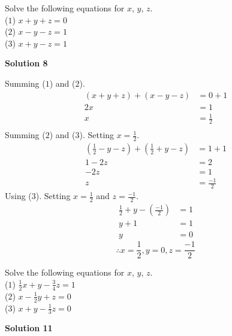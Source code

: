 \begin{tcolorbox}[title=Problem 8, breakable]
    Solve the following equations for $x$, $y$, $z$. \\
    ($1$) $x + y + z = 0$ \\
    ($2$) $x - y - z = 1$ \\
    ($3$) $x + y - z = 1$
\end{tcolorbox}

\textbf{Solution 8}

Summing ($1$) and ($2$).
\begin{align*}
    (x + y + z) + (x - y - z) &= 0 + 1 \\
    2x &= 1 \\
    x &= \frac{1}{2} \\
\end{align*}
Summing ($2$) and ($3$). Setting $x = \frac{1}{2}$.
\begin{align*}
    (\frac{1}{2} - y - z) + (\frac{1}{2} + y - z) &= 1 + 1 \\
    1 - 2z &= 2 \\
    -2z &= 1 \\
    z &= \frac{-1}{2} 
\end{align*}
Using ($3$). Setting $x = \frac{1}{2}$ and $z = \frac{-1}{2}$.
\begin{align*}
    \frac{1}{2} + y - (\frac{-1}{2}) &= 1 \\
    y + 1 &= 1 \\
    y &= 0
\end{align*}
\[\therefore x = \frac{1}{2}, y = 0, z = \frac{-1}{2} \]

\begin{tcolorbox}[title=Problem 11, breakable]
    Solve the following equations for $x$, $y$, $z$. \\
    ($1$) $\frac{1}{2}x + y - \frac{3}{4}z = 1$ \\
    ($2$) $x - \frac{1}{2}y + z = 0$ \\
    ($3$) $x + y - \frac{1}{3}z = 0$
\end{tcolorbox}

\textbf{Solution 11}

